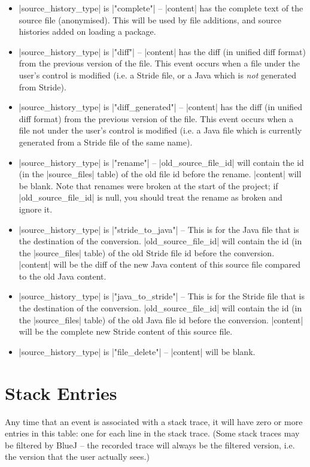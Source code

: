\documentclass{report}
\begin{document}
\begin{itemize}
\item |source_history_type| is |"complete"| -- |content| has the complete text
  of the source file (anonymised).  This will be
  used by file additions, and source histories added on loading a package.
\item |source_history_type| is |"diff"| -- |content| has the diff (in unified diff format) from
  the previous version of the file.  This event occurs when a file under the user's control
  is modified (i.e. a Stride file, or a Java which is \textit{not} generated from Stride).
\item |source_history_type| is |"diff_generated"| -- |content| has the diff (in unified diff format) from
  the previous version of the file.  This event occurs when a file not under the user's control
  is modified (i.e. a Java file which is currently generated from a Stride file of the same name).
\item |source_history_type| is |"rename"| -- |old_source_file_id| will contain the
  id (in the |source_files| table) of the old file id before the rename.  |content| will be blank.
  Note that renames were broken at the start of the project; if |old_source_file_id| is null, you should
  treat the rename as broken and ignore it.
\item |source_history_type| is |"stride_to_java"| -- This is for the Java file that is
  the destination of the conversion.  |old_source_file_id| will contain the
  id (in the |source_files| table) of the old Stride file id before the conversion.
  |content| will be the diff of the new Java content of this source file compared to the old Java content.
\item |source_history_type| is |"java_to_stride"| -- This is for the Stride file that is
  the destination of the conversion.  |old_source_file_id| will contain the
  id (in the |source_files| table) of the old Java file id before the conversion.
  |content| will be the complete new Stride content of this source file.
\item |source_history_type| is |"file_delete"| -- |content| will be blank.
\end{itemize}

\section{Stack Entries}


Any time that an event is associated with a stack trace, it will have
zero or more entries in this table: one for each line in the stack
trace.  (Some stack traces may be filtered by BlueJ -- the recorded
trace will always be the filtered version, i.e. the version that the
user actually sees.)
\end{document}
